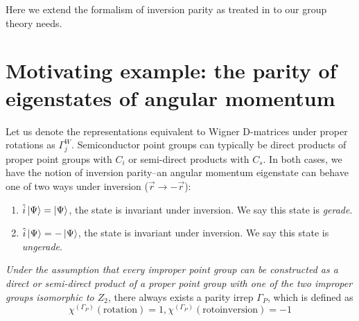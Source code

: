 \documentclass[12pt]{article}
\begin{document}
	Here we extend the formalism of inversion parity as treated in \cite{shiau} to our group theory needs.
	
	\section{Motivating example: the parity of eigenstates of angular momentum}	
	
	Let us denote the representations equivalent to Wigner D-matrices under proper rotations as $\Gamma^W_j$. Semiconductor point groups can typically be direct products of proper point groups with $C_i$ or semi-direct products with $C_s$. In both cases, we have the notion of inversion parity--an angular momentum eigenstate can behave one of two ways under inversion ($\vec{r}\to -\vec{r}$):
	\begin{enumerate}
	\item $\hat{i}\ket{\Psi} = \ket{\Psi}$, the state is invariant under inversion. We say this state is \textit{gerade}.
	\item $\hat{i}\ket{\Psi} = -\ket{\Psi}$, the state is invariant under inversion. We say this state is \textit{ungerade}.
	\end{enumerate}
	\textit{Under the assumption that every improper point group can be constructed as a direct or semi-direct product of a proper point group with one of the two improper groups isomorphic to $Z_2$}, there always exists a parity irrep $\Gamma_P$, which is defined as
	$$\chi^{\left(\Gamma_P\right)}\left(\text{rotation}\right)=1, \chi^{\left(\Gamma_P\right)}\left(\text{rotoinversion}\right)=-1$$
	
\end{document}
